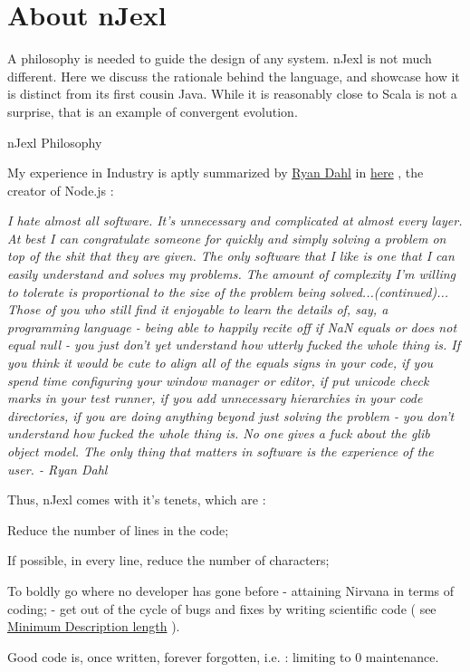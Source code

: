 \chapter{About nJexl}\label{nJexl}

{\LARGE A} philosophy is needed to guide the design of any system. nJexl is not much different.
Here we discuss the rationale behind the language, and showcase how it is distinct from its first cousin Java.
While it is reasonably close to Scala is not a surprise, that is an example of convergent evolution.

\begin{section}{nJexl Philosophy}


My experience in Industry is aptly summarized by \href{https://en.wikipedia.org/wiki/Node.js}{Ryan Dahl}
in \href{http://harmful.cat-v.org/software/node.js}{here} , the creator of Node.js :

\begin{center}
\emph{
I hate almost all software. It's unnecessary and complicated at almost every layer. At best I can congratulate someone for quickly and simply solving a problem on top of the shit that they are given. The only software that I like is one that I can easily understand and solves my problems. The amount of complexity I'm willing to tolerate is proportional to the size of the problem being solved...(continued)...
Those of you who still find it enjoyable to learn the details of, say, a programming language - being able to happily recite off if NaN equals or does not equal null - you just don't yet understand how utterly fucked the whole thing is. If you think it would be cute to align all of the equals signs in your code, if you spend time configuring your window manager or editor, if put unicode check marks in your test runner, if you add unnecessary hierarchies in your code directories, if you are doing anything beyond just solving the problem - you don't understand how fucked the whole thing is. No one gives a fuck about the glib object model.
\emph{The only thing that matters in software is the experience of the user.}   - Ryan Dahl
}
\end{center}

Thus, nJexl comes with it's tenets, which are :

\begin{enumerate}
\item{ Reduce the number of lines in the code; }
\item{ If possible, in every line, reduce the number of characters; }
\item{ To boldly go where no developer has gone before - attaining Nirvana in terms of coding;
    - get out of the cycle of bugs and fixes by writing scientific code 
    ( see  \href{http://en.wikipedia.org/wiki/Minimum_description_length}{Minimum Description length} ).
\item{Good code is, once written, forever forgotten, i.e. : limiting to 0 maintenance. }    
}
\end{enumerate}


\end{section}
